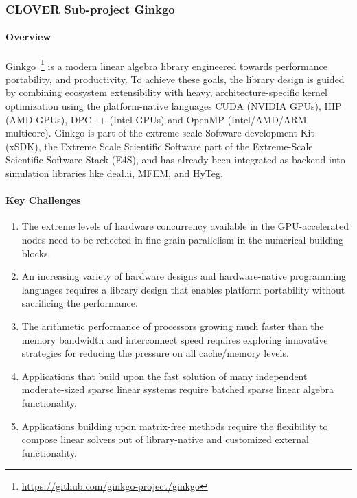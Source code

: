 \newpage
\subsubsection{ CLOVER Sub-project Ginkgo} \label{subsubsect:peeks}
\paragraph{Overview} 
Ginkgo~\footnote{\url{https://github.com/ginkgo-project/ginkgo}} 
is a modern linear algebra library engineered towards performance portability, and productivity. 
To achieve these goals, the library design is guided by combining ecosystem extensibility with heavy, 
architecture-specific kernel optimization using the platform-native languages CUDA (NVIDIA GPUs), 
HIP (AMD GPUs), DPC++ (Intel GPUs) and OpenMP (Intel/AMD/ARM multicore). 
Ginkgo is part of the extreme-scale Software development Kit (xSDK), 
the Extreme Scale Scientific Software part of the Extreme-Scale Scientific Software Stack (E4S), 
and has already been integrated as backend into simulation libraries like deal.ii, MFEM, and HyTeg. 



\paragraph{Key  Challenges}
\begin{enumerate}
\item 
The extreme levels of hardware concurrency available in the 
GPU-accelerated nodes need to be reflected in fine-grain parallelism 
in the numerical building blocks.
\item
An increasing variety of hardware designs and hardware-native programming 
languages requires a library design that enables platform portability without sacrificing 
the performance.
\item
The arithmetic performance of processors growing much faster than the memory 
bandwidth and interconnect speed requires exploring innovative strategies for 
reducing the pressure on all cache/memory levels.
\item
Applications that build upon the fast solution of many independent moderate-sized 
sparse linear systems require batched sparse linear algebra functionality.
\item
Applications building upon matrix-free methods require the flexibility to 
compose linear solvers out of library-native and customized external functionality.
\end{enumerate}

